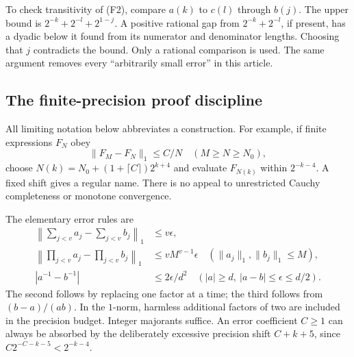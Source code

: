 To check transitivity of (F2), compare $a(k)$ to $c(l)$ through $b(j)$.
The upper bound is $2^{-k}+2^{-l}+2^{1-j}$. A positive rational gap from
$2^{-k}+2^{-l}$, if present, has a dyadic below it found from its numerator
and denominator lengths. Choosing that $j$ contradicts the bound.
Only a rational comparison is used. The same argument removes every
``arbitrarily small error'' in this article.

\subsection{The finite-precision proof discipline}
All limiting notation below abbreviates a construction. For example, if
finite expressions $F_N$ obey
\[
 \|F_M-F_N\|_1\le C/N\quad(M\ge N\ge N_0),
\]
choose $N(k)=N_0+(1+\lceil C\rceil)2^{k+4}$ and evaluate $F_{N(k)}$
within $2^{-k-4}$. A fixed shift gives a regular name. There is no appeal
to unrestricted Cauchy completeness or monotone convergence.

The elementary error rules are
\begin{align}
 \left\|\sum_{j<v}a_j-\sum_{j<v}b_j\right\|_1&\le v\epsilon,
       \label{eq:f-sum}\\
 \left\|\prod_{j<v}a_j-\prod_{j<v}b_j\right\|_1
       &\le vM^{v-1}\epsilon
       \quad(\|a_j\|_1,\|b_j\|_1\le M),\label{eq:f-prod}\\
 |a^{-1}-b^{-1}|&\le2\epsilon/d^2
       \quad(|a|\ge d,\ |a-b|\le\epsilon\le d/2).
       \label{eq:f-inv}
\end{align}
The second follows by replacing one factor at a time; the third follows
from $(b-a)/(ab)$. In the $1$-norm, harmless additional factors of two
are included in the precision budget. Integer majorants suffice. An error
coefficient $C\ge1$ can always be absorbed by the deliberately excessive
precision shift $C+k+5$, since $C2^{-C-k-5}<2^{-k-4}$.


